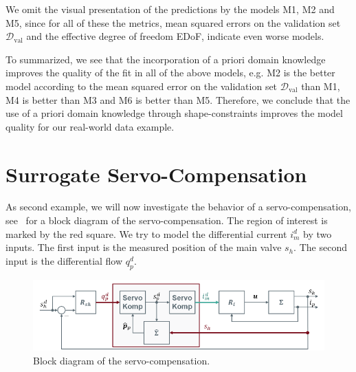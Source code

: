 We omit the visual presentation of the predictions by the models M1, M2 and M5, since for all of these the metrics, mean squared errors on the validation set $\mathcal{D}_{\text{val}}$ and the effective degree of freedom EDoF, indicate even worse models.

To summarized, we see that the incorporation of a priori domain knowledge improves the quality of the fit in all of the above models, e.g. M2 is the better model according to the mean squared error on the validation set $\mathcal{D}_{\text{val}}$ than M1, M4 is better than M3 and M6 is better than M5. Therefore, we conclude that the use of a priori domain knowledge through shape-constraints improves the model quality for our real-world data example. 

\section{Surrogate Servo-Compensation} \label{sec:real-world-application2}

As second example, we will now investigate the behavior of a servo-compensation, see~ for a block diagram of the servo-compensation. The region of interest is marked by the red square. We try to model the differential current $i_m^d$ by two inputs. The first input is the measured position of the main valve $s_h$. The second input is the differential flow $q_p^d$. 

\begin{figure}[H]
	\centering
	\includegraphics[width=0.8\columnwidth]{graphics/pgfplots/cha5/Bosch/blockschaltbild.png}
	\caption{Block diagram of the servo-compensation.}
	\label{fig:blockschaltbild}
\end{figure}

